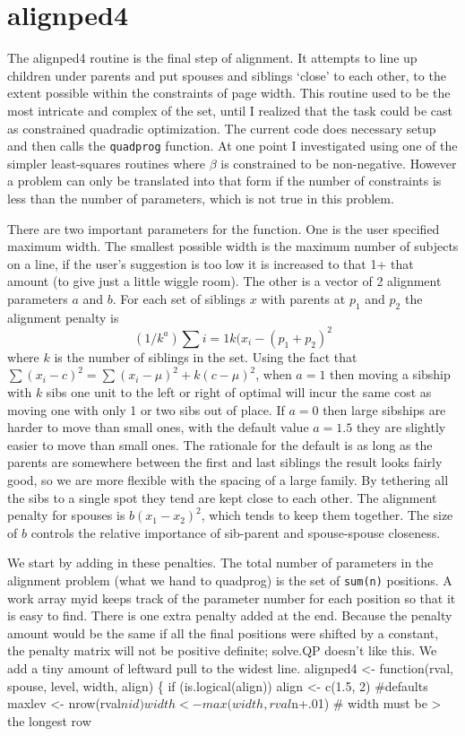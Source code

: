 \documentclass{article}
\begin{document}
\section{alignped4}
The alignped4 routine is the final step of alignment.  It attempts to line
up children under parents and put spouses and siblings `close' to each other,%
to the extent possible within the constraints of page width.  This routine
used to be the most intricate and complex of the set, until I realized that
the task could be cast as constrained quadradic optimization.
The current code does necessary setup and then calls the {\tt{}quadprog}
function.  
At one point I investigated using one of the simpler least-squares routines
where $\beta$ is constrained to be non-negative. 
However a problem can only be translated into that form if the number
of constraints is less than the number of parameters, which is not
true in this problem.

There are two important parameters for the function.  One is the user specified
maximum width.  The smallest possible width is the maximum number of subjects
on a line, if the user's suggestion  %
is too low it is increased to that 1+ that
amount (to give just a little wiggle room).
The other is a vector of 2 alignment parameters $a$ and $b$.
For each set of siblings ${x}$ with parents at $p_1$ and $p_2$ the
alignment penalty is
$$
   (1/k^a)\sum{i=1}{k} (x_i - (p_1 + p_2)^2
$$
where $k$ is the number of siblings in the set.
Using the fact that $\sum(x_i-c)^2 = \sum(x_i-\mu)^2 + k(c-\mu)^2$,
when $a=1$ then moving a sibship with $k$ sibs one unit to the left or
right of optimal will incur the same cost as moving one with only 1 or
two sibs out of place.  If $a=0$ then large sibships are harder to move
than small ones, with the default value $a=1.5$ they are slightly easier 
to move than small ones.  The rationale for the default is as long as the
parents are somewhere between the first and last siblings the result looks
fairly good, so we are more flexible with the spacing of a large family.
By tethering all the sibs to a single spot they tend are kept close to 
each other.
The alignment penalty for spouses is $b(x_1 - x_2)^2$, which tends to keep 
them together.  The size of $b$ controls the relative importance of sib-parent
and spouse-spouse closeness.

We start by adding in these penalties.  The total number of parameters
in the alignment problem (what we hand to quadprog) is the set 
of {\tt{}sum(n)} positions.  A work array myid keeps track of the parameter
number for each position so that it is easy to find.
There is one extra penalty added at the end.  Because the penalty amount
would be the same if all the final positions were shifted by a constant,
the penalty matrix will not be positive definite; solve.QP doesn't like  %
this.  We add a tiny amount of leftward pull to the widest line.
\nwenddocs{}\endmoddef
alignped4 <- function(rval, spouse, level, width, align) \{
    if (is.logical(align)) align <- c(1.5, 2)  #defaults
    maxlev <- nrow(rval$nid)
    width <- max(width, rval$n+.01)   # width must be > the longest row
\end{document}
